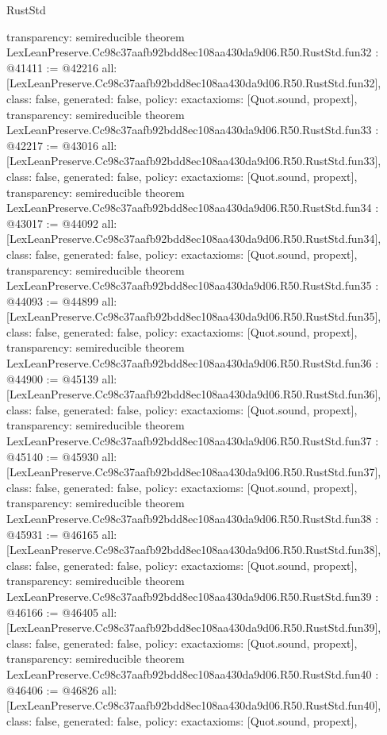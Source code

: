 \begin{lexlean}{RustStd}
\begin{coremodule}
{  transparency: semireducible
}
theorem LexLeanPreserve.Cc98c37aafb92bdd8ec108aa430da9d06.R50.RustStd.fun32 : @41411 := @42216 {
  all: [LexLeanPreserve.Cc98c37aafb92bdd8ec108aa430da9d06.R50.RustStd.fun32],
  class: false,
  generated: false,
  policy: exact{axioms: [Quot.sound, propext]},
  transparency: semireducible
}
theorem LexLeanPreserve.Cc98c37aafb92bdd8ec108aa430da9d06.R50.RustStd.fun33 : @42217 := @43016 {
  all: [LexLeanPreserve.Cc98c37aafb92bdd8ec108aa430da9d06.R50.RustStd.fun33],
  class: false,
  generated: false,
  policy: exact{axioms: [Quot.sound, propext]},
  transparency: semireducible
}
theorem LexLeanPreserve.Cc98c37aafb92bdd8ec108aa430da9d06.R50.RustStd.fun34 : @43017 := @44092 {
  all: [LexLeanPreserve.Cc98c37aafb92bdd8ec108aa430da9d06.R50.RustStd.fun34],
  class: false,
  generated: false,
  policy: exact{axioms: [Quot.sound, propext]},
  transparency: semireducible
}
theorem LexLeanPreserve.Cc98c37aafb92bdd8ec108aa430da9d06.R50.RustStd.fun35 : @44093 := @44899 {
  all: [LexLeanPreserve.Cc98c37aafb92bdd8ec108aa430da9d06.R50.RustStd.fun35],
  class: false,
  generated: false,
  policy: exact{axioms: [Quot.sound, propext]},
  transparency: semireducible
}
theorem LexLeanPreserve.Cc98c37aafb92bdd8ec108aa430da9d06.R50.RustStd.fun36 : @44900 := @45139 {
  all: [LexLeanPreserve.Cc98c37aafb92bdd8ec108aa430da9d06.R50.RustStd.fun36],
  class: false,
  generated: false,
  policy: exact{axioms: [Quot.sound, propext]},
  transparency: semireducible
}
theorem LexLeanPreserve.Cc98c37aafb92bdd8ec108aa430da9d06.R50.RustStd.fun37 : @45140 := @45930 {
  all: [LexLeanPreserve.Cc98c37aafb92bdd8ec108aa430da9d06.R50.RustStd.fun37],
  class: false,
  generated: false,
  policy: exact{axioms: [Quot.sound, propext]},
  transparency: semireducible
}
theorem LexLeanPreserve.Cc98c37aafb92bdd8ec108aa430da9d06.R50.RustStd.fun38 : @45931 := @46165 {
  all: [LexLeanPreserve.Cc98c37aafb92bdd8ec108aa430da9d06.R50.RustStd.fun38],
  class: false,
  generated: false,
  policy: exact{axioms: [Quot.sound, propext]},
  transparency: semireducible
}
theorem LexLeanPreserve.Cc98c37aafb92bdd8ec108aa430da9d06.R50.RustStd.fun39 : @46166 := @46405 {
  all: [LexLeanPreserve.Cc98c37aafb92bdd8ec108aa430da9d06.R50.RustStd.fun39],
  class: false,
  generated: false,
  policy: exact{axioms: [Quot.sound, propext]},
  transparency: semireducible
}
theorem LexLeanPreserve.Cc98c37aafb92bdd8ec108aa430da9d06.R50.RustStd.fun40 : @46406 := @46826 {
  all: [LexLeanPreserve.Cc98c37aafb92bdd8ec108aa430da9d06.R50.RustStd.fun40],
  class: false,
  generated: false,
  policy: exact{axioms: [Quot.sound, propext]},
}
\end{coremodule}
\end{lexlean}
